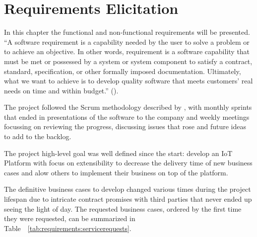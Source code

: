 \chapter{Requirements Elicitation}
\label{chap:requirements}

In this chapter the functional and non-functional requirements will be presented. ``A software requirement is a capability needed by the user to solve a problem or to achieve an objective. In other words, requirement is a software capability that must be met or possessed by a system or system component to satisfy a contract, standard, specification, or other formally imposed documentation. Ultimately, what we want to achieve is to develop quality software that meets customers' real needs on time and within budget.'' (\cite{req}).

The project followed the Scrum methodology described by \cite{schwaber1997scrum}, with monthly sprints that ended in presentations of the software to the company and weekly meetings focussing on reviewing the progress, discussing issues that rose and future ideas to add to the backlog.

The project high-level goal was well defined since the start: develop an IoT Platform with focus on extensibility to decrease the delivery time of new business cases and alow others to implement their business on top of the platform.

The definitive business cases to develop changed various times during the project lifespan due to intricate contract promises with third parties that never ended up seeing the light of day. The requested business cases, ordered by the first time they were requested, can be summarized in Table~~\ref{tab:requirements:servicerequests}.


